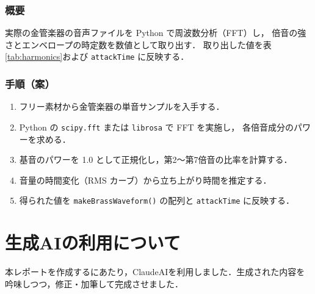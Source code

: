 \documentclass[a4paper,12pt]{jsarticle}
\begin{document}
\subsubsection{概要}
実際の金管楽器の音声ファイルを Python で周波数分析（FFT）し，
倍音の強さとエンベロープの時定数を数値として取り出す．
取り出した値を表\ref{tab:harmonics}および \texttt{attackTime} に反映する．

\subsubsection{手順（案）}

\begin{enumerate}
  \item フリー素材から金管楽器の単音サンプルを入手する．
  \item Python の \texttt{scipy.fft} または \texttt{librosa} で FFT を実施し，
        各倍音成分のパワーを求める．
  \item 基音のパワーを 1.0 として正規化し，第2〜第7倍音の比率を計算する．
  \item 音量の時間変化（RMS カーブ）から立ち上がり時間を推定する．
  \item 得られた値を \texttt{makeBrassWaveform()} の配列と
        \texttt{attackTime} に反映する．
\end{enumerate}

\section{生成AIの利用について}
本レポートを作成するにあたり，ClaudeAIを利用しました．生成された内容を吟味しつつ，修正・加筆して完成させました．
\end{document}
